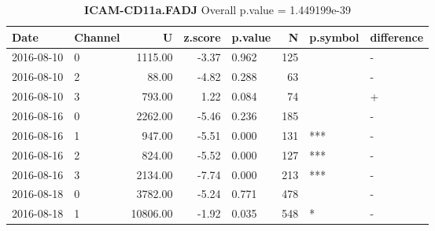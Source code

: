 \begin{table}[ht]
\caption[ICAM-CD11a.FADJ]{\textbf{ICAM-CD11a.FADJ} Overall p.value = 1.449199e-39}
\centering
\begin{tabular}{llrrlrll}
  \hline
Date & Channel & U & z.score & p.value & N & p.symbol & difference \\ 
  \hline
2016-08-10 & 0 & 1115.00 & -3.37 & 0.962 & 125 &  & - \\ 
  2016-08-10 & 2 & 88.00 & -4.82 & 0.288 &  63 &  & - \\ 
  2016-08-10 & 3 & 793.00 & 1.22 & 0.084 &  74 &  & + \\ 
  2016-08-16 & 0 & 2262.00 & -5.46 & 0.236 & 185 &  & - \\ 
  2016-08-16 & 1 & 947.00 & -5.51 & 0.000 & 131 & *** & - \\ 
  2016-08-16 & 2 & 824.00 & -5.52 & 0.000 & 127 & *** & - \\ 
  2016-08-16 & 3 & 2134.00 & -7.74 & 0.000 & 213 & *** & - \\ 
  2016-08-18 & 0 & 3782.00 & -5.24 & 0.771 & 478 &  & - \\ 
  2016-08-18 & 1 & 10806.00 & -1.92 & 0.035 & 548 & * & - \\ 
   \hline
\end{tabular}
\end{table}

